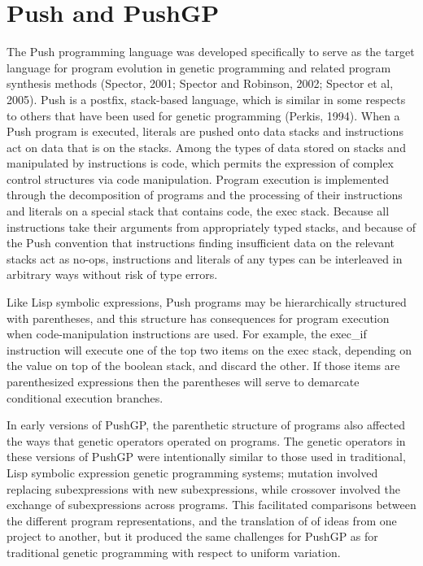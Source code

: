 \documentclass[graybox]{svmult}
\begin{document}
\section{Push and PushGP}

The Push programming language was developed specifically to serve as the target language for program evolution in genetic programming and related program synthesis methods
(Spector, 2001; Spector and Robinson, 2002; Spector et al, 2005). Push is a postfix, stack-based language, which is similar in some respects to others that have been used for genetic programming (Perkis, 1994). 
When a Push program is executed, literals are pushed
onto data stacks and instructions act on data that is on the stacks.
Among the types of data stored on stacks and manipulated by instructions is {\ttfamily code}, which permits the expression of complex control structures via code manipulation. Program execution is implemented through the decomposition of programs and the processing of their instructions and literals on a special stack that contains code, the {\ttfamily exec} stack.
Because all instructions take their arguments from appropriately typed stacks, and because of the Push convention that instructions finding insufficient data on the relevant stacks
act as {\ttfamily no-op}s, instructions and literals of any types can be interleaved in arbitrary ways without risk of type errors.

Like Lisp symbolic expressions, Push programs may be hierarchically
structured with parentheses, and this structure has consequences for program execution when code-manipulation instructions are used. For example, the {\ttfamily exec\_if} instruction will execute one of the top two items on the {\ttfamily exec} stack, depending on the value on top of the {\ttfamily boolean} stack, and discard the other. If those items are parenthesized expressions then the parentheses will serve to demarcate conditional execution branches.

In early versions of PushGP, the parenthetic structure of programs also affected the ways that  genetic
operators operated on programs. The genetic operators in these versions of PushGP were intentionally similar to those used in traditional, Lisp symbolic expression genetic programming systems; mutation involved replacing subexpressions with new subexpressions, while crossover involved the exchange of subexpressions across programs. This facilitated comparisons between the different program representations, and the translation of of ideas from one project to another, but it produced the same challenges for PushGP as for traditional genetic programming with respect to uniform variation.
\end{document}
